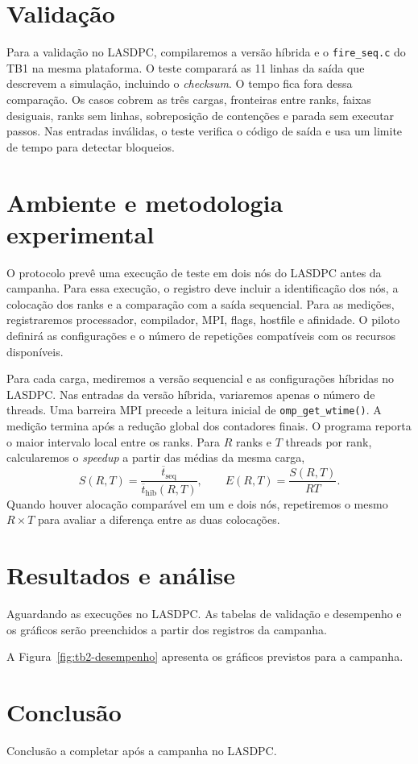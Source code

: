 \documentclass[12pt,a4paper]{article}
\begin{document}
\section{Validação}
\label{sec:validacao}

Para a validação no LASDPC, compilaremos a versão híbrida e o \texttt{fire\_seq.c} do TB1 na mesma plataforma. O teste comparará as 11 linhas da saída que descrevem a simulação, incluindo o \textit{checksum}. O tempo fica fora dessa comparação. Os casos cobrem as três cargas, fronteiras entre ranks, faixas desiguais, ranks sem linhas, sobreposição de contenções e parada sem executar passos. Nas entradas inválidas, o teste verifica o código de saída e usa um limite de tempo para detectar bloqueios.

\section{Ambiente e metodologia experimental}
\label{sec:metodologia}

O protocolo prevê uma execução de teste em dois nós do LASDPC antes da campanha. Para essa execução, o registro deve incluir a identificação dos nós, a colocação dos ranks e a comparação com a saída sequencial. Para as medições, registraremos processador, compilador, MPI, flags, hostfile e afinidade. O piloto definirá as configurações e o número de repetições compatíveis com os recursos disponíveis.

Para cada carga, mediremos a versão sequencial e as configurações híbridas no LASDPC. Nas entradas da versão híbrida, variaremos apenas o número de threads. Uma barreira MPI precede a leitura inicial de \texttt{omp\_get\_wtime()}. A medição termina após a redução global dos contadores finais. O programa reporta o maior intervalo local entre os ranks. Para $R$ ranks e $T$ threads por rank, calcularemos o \textit{speedup} a partir das médias da mesma carga,
\[
S(R,T) = \frac{\overline{t}_{\mathrm{seq}}}{\overline{t}_{\mathrm{hib}}(R,T)},
\qquad E(R,T) = \frac{S(R,T)}{R T}.
\]
Quando houver alocação comparável em um e dois nós, repetiremos o mesmo $R \times T$ para avaliar a diferença entre as duas colocações.

\section{Resultados e análise}

Aguardando as execuções no LASDPC. As tabelas de validação e desempenho e os gráficos serão preenchidos a partir dos registros da campanha.

A Figura~\ref{fig:tb2-desempenho} apresenta os gráficos previstos para a campanha.



\section{Conclusão}

Conclusão a completar após a campanha no LASDPC.
\end{document}
